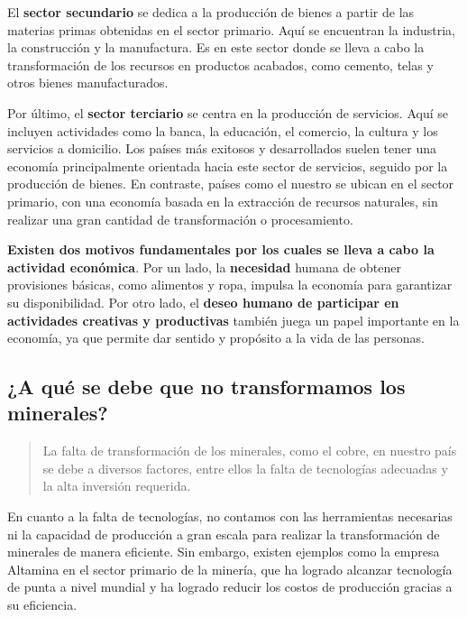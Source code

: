 \documentclass[
  letterpaper,
  DIV=11,
  numbers=noendperiod]{scrartcl}
\begin{document}
El \textbf{sector secundario} se dedica a la producción de bienes a
partir de las materias primas obtenidas en el sector primario. Aquí se
encuentran la industria, la construcción y la manufactura. Es en este
sector donde se lleva a cabo la transformación de los recursos en
productos acabados, como cemento, telas y otros bienes manufacturados.

Por último, el \textbf{sector terciario} se centra en la producción de
servicios. Aquí se incluyen actividades como la banca, la educación, el
comercio, la cultura y los servicios a domicilio. Los países más
exitosos y desarrollados suelen tener una economía principalmente
orientada hacia este sector de servicios, seguido por la producción de
bienes. En contraste, países como el nuestro se ubican en el sector
primario, con una economía basada en la extracción de recursos
naturales, sin realizar una gran cantidad de transformación o
procesamiento.

\textbf{Existen dos motivos fundamentales por los cuales se lleva a cabo
la actividad económica}. Por un lado, la \textbf{necesidad} humana de
obtener provisiones básicas, como alimentos y ropa, impulsa la economía
para garantizar su disponibilidad. Por otro lado, el \textbf{deseo
humano de participar en actividades creativas y productivas} también
juega un papel importante en la economía, ya que permite dar sentido y
propósito a la vida de las personas.

\hypertarget{a-quuxe9-se-debe-que-no-transformamos-los-minerales}{%
\subsection{¿A qué se debe que no transformamos los
minerales?}\label{a-quuxe9-se-debe-que-no-transformamos-los-minerales}}

\begin{quote}
La falta de transformación de los minerales, como el cobre, en nuestro
país se debe a diversos factores, entre ellos la falta de tecnologías
adecuadas y la alta inversión requerida.
\end{quote}

En cuanto a la falta de tecnologías, no contamos con las herramientas
necesarias ni la capacidad de producción a gran escala para realizar la
transformación de minerales de manera eficiente. Sin embargo, existen
ejemplos como la empresa Altamina en el sector primario de la minería,
que ha logrado alcanzar tecnología de punta a nivel mundial y ha logrado
reducir los costos de producción gracias a su eficiencia.
\end{document}
